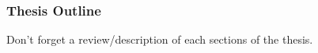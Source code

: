 

\subsubsection{Thesis Outline}
Don't forget a review/description of each sections of the thesis.



